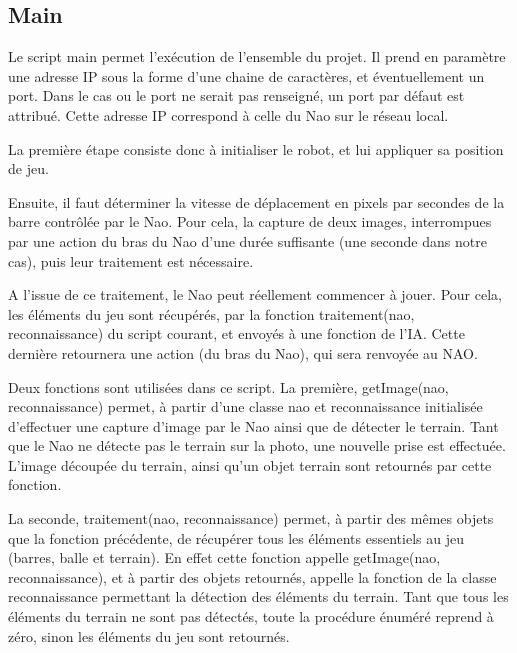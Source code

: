 \subsection{Main}
\label{sub:Main}

  \par Le script main permet l'exécution de l'ensemble du projet.
  Il prend en paramètre une adresse IP sous la forme d'une chaine de caractères, et éventuellement un port.
  Dans le cas ou le port ne serait pas renseigné, un port par défaut est attribué.
  Cette adresse IP correspond à celle du Nao sur le réseau local.
  \par La première étape consiste donc à initialiser le robot, et lui appliquer sa position de jeu.
  \par Ensuite, il faut déterminer la vitesse de déplacement en pixels par secondes de la barre contrôlée par le Nao.
  Pour cela, la capture de deux images, interrompues par une action du bras du Nao d'une durée suffisante (une seconde dans notre cas), puis leur traitement est nécessaire.
  \par A l'issue de ce traitement, le Nao peut réellement commencer à jouer.
  Pour cela, les éléments du jeu sont récupérés, par la fonction traitement(nao, reconnaissance) du script courant, et envoyés à une fonction de l'IA.
  Cette dernière retournera une action (du bras du Nao), qui sera renvoyée au NAO.

  \par Deux fonctions sont utilisées dans ce script.
  La première, getImage(nao, reconnaissance) permet, à partir d'une classe nao et reconnaissance initialisée d'effectuer une capture d'image par le Nao ainsi que de détecter le terrain.
  Tant que le Nao ne détecte pas le terrain sur la photo, une nouvelle prise est effectuée.
  L'image découpée du terrain, ainsi qu'un objet terrain sont retournés par cette fonction.
  \par La seconde, traitement(nao, reconnaissance) permet, à partir des mêmes objets que la fonction précédente, de récupérer tous les éléments essentiels au jeu (barres, balle et terrain).
  En effet cette fonction appelle getImage(nao, reconnaissance), et à partir des objets retournés, appelle la fonction de la classe reconnaissance permettant la détection des éléments du terrain.
  Tant que tous les éléments du terrain ne sont pas détectés, toute la procédure énuméré reprend à zéro, sinon les éléments du jeu sont retournés.
